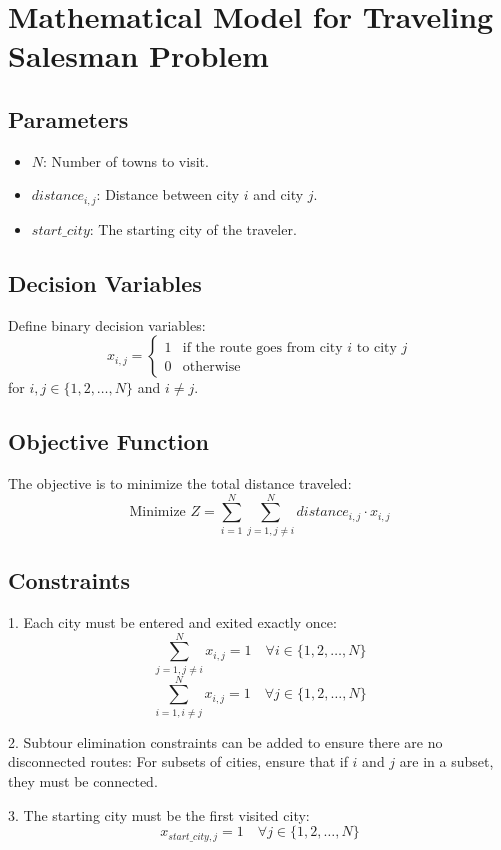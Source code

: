\documentclass{article}
\begin{document}
\section*{Mathematical Model for Traveling Salesman Problem}

\subsection*{Parameters}
\begin{itemize}
    \item $N$: Number of towns to visit.
    \item $distance_{i,j}$: Distance between city $i$ and city $j$.
    \item $start\_city$: The starting city of the traveler.
\end{itemize}

\subsection*{Decision Variables}
Define binary decision variables:
\[
x_{i,j} = 
\begin{cases} 
1 & \text{if the route goes from city } i \text{ to city } j \\
0 & \text{otherwise}
\end{cases}
\]
for $i, j \in \{1, 2, \ldots, N\}$ and $i \neq j$.

\subsection*{Objective Function}
The objective is to minimize the total distance traveled:
\[
\text{Minimize } Z = \sum_{i=1}^{N} \sum_{j=1, j \neq i}^{N} distance_{i,j} \cdot x_{i,j}
\]

\subsection*{Constraints}
1. Each city must be entered and exited exactly once:
\[
\sum_{j=1, j \neq i}^{N} x_{i,j} = 1 \quad \forall i \in \{1, 2, \ldots, N\}
\]
\[
\sum_{i=1, i \neq j}^{N} x_{i,j} = 1 \quad \forall j \in \{1, 2, \ldots, N\}
\]

2. Subtour elimination constraints can be added to ensure there are no disconnected routes:
   For subsets of cities, ensure that if $i$ and $j$ are in a subset, they must be connected.

3. The starting city must be the first visited city:
\[
x_{start\_city, j} = 1 \quad \forall j \in \{1, 2, \ldots, N\}
\]
\end{document}
